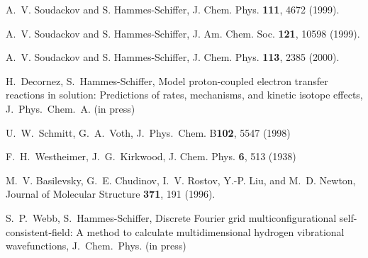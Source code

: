 \documentclass[oneside,11pt,openany]{book}
\begin{document}
%
\begin{thebibliography}{99}

 A.~V. Soudackov and S. Hammes-Schiffer,
J. Chem. Phys. {\bf 111},  4672 (1999).

 A.~V. Soudackov and S. Hammes-Schiffer,
J. Am. Chem. Soc. {\bf 121}, 10598 (1999).

 A.~V. Soudackov and S. Hammes-Schiffer,
J. Chem. Phys. {\bf 113},  2385 (2000).

 H.~Decornez, S.~Hammes-Schiffer,
Model proton-coupled electron transfer reactions in solution:
Predictions of rates, mechanisms, and kinetic isotope effects,
J.~Phys.~Chem.~A. (in press)

 U.~W.~Schmitt, G.~A.~Voth,
J.~Phys.~Chem. B{\bf 102}, 5547 (1998)

F.~H.~Westheimer, J.~G.~Kirkwood, J. Chem. Phys. {\bf 6}, 513 (1938)

M.~V. Basilevsky, G.~E. Chudinov, I.~V. Rostov, Y.-P. Liu, and M.~D. Newton,
  Journal of Molecular Structure {\bf 371},  191  (1996).

 S.~P.~Webb, S.~Hammes-Schiffer,
Discrete Fourier grid multiconfigurational self-consistent-field:
A method to calculate multidimensional hydrogen vibrational wavefunctions,
J.~Chem.~Phys. (in press)

\end{thebibliography}
\end{document}
